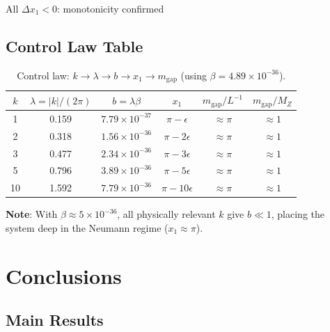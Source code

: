 \documentclass[11pt,a4paper]{article}
\newcommand{\mgap}{m_{\mathrm{gap}}}
\newcommand{\MZ}{M_Z}
\newcommand{\emark}{\textcolor{green!70!black}{\checkmark}}
\theoremstyle{definition}
\theoremstyle{plain}
\theoremstyle{remark}
\begin{document}
All $\Delta x_1 < 0$: monotonicity confirmed \emark

\subsection{Control Law Table}

\begin{table}[htbp]
\centering
\caption{Control law: $k \to \lambda \to b \to x_1 \to \mgap$ (using $\beta = 4.89 \times 10^{-36}$).}
\label{tab:control-law}
\begin{tabular}{@{}cccccc@{}}
\toprule
$k$ & $\lambda = |k|/(2\pi)$ & $b = \lambda\beta$ & $x_1$ & $\mgap/L^{-1}$ & $\mgap/\MZ$ \\
\midrule
1 & 0.159 & $7.79 \times 10^{-37}$ & $\pi - \epsilon$ & $\approx \pi$ & $\approx 1$ \\
2 & 0.318 & $1.56 \times 10^{-36}$ & $\pi - 2\epsilon$ & $\approx \pi$ & $\approx 1$ \\
3 & 0.477 & $2.34 \times 10^{-36}$ & $\pi - 3\epsilon$ & $\approx \pi$ & $\approx 1$ \\
5 & 0.796 & $3.89 \times 10^{-36}$ & $\pi - 5\epsilon$ & $\approx \pi$ & $\approx 1$ \\
10 & 1.592 & $7.79 \times 10^{-36}$ & $\pi - 10\epsilon$ & $\approx \pi$ & $\approx 1$ \\
\bottomrule
\end{tabular}
\end{table}

\textbf{Note}: With $\beta \approx 5 \times 10^{-36}$, all physically relevant $k$ give
$b \ll 1$, placing the system deep in the Neumann regime ($x_1 \approx \pi$).

\section{Conclusions}
\label{sec:conclusions}

\subsection{Main Results}
\end{document}
